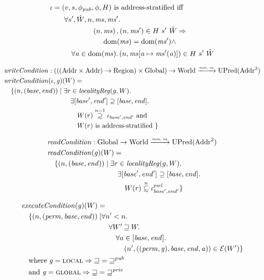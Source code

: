 \documentclass[a4paper]{article}
\newcommand{\update}[2]{[#1 \mapsto #2]}
\newcommand{\monnefun}{\xrightarrow{\textit{\tiny{mon, ne}}}}
\newcommand{\fun}{\rightarrow}
\newcommand\subsetsim{\mathrel{\ooalign{\raise.2ex\hbox{$\subset$}\cr
      \hidewidth\lower.8ex\hbox{\scalebox{0.9}{$\sim$}}\hidewidth\cr}}}
\newcommand\supsetsim{\mathrel{\ooalign{\raise.2ex\hbox{$\supset$}\cr
      \hidewidth\lower.8ex\hbox{\scalebox{0.9}{$\sim$}}\hidewidth\cr}}}
\newcommand{\nsubsim}[1][n]{\stackrel{\tiny{#1}}{\subsetsim}}
\newcommand{\nsupsim}[1][n]{\stackrel{\tiny{#1}}{\supsetsim}}
\DeclareMathOperator{\dom}{dom}
\newcommand{\var}[1]{\mathit{#1}}
\newcommand{\hs}{\var{ms}}
\newcommand{\ms}{\hs}
\newcommand{\gl}{\var{g}}
\newcommand{\addr}{\var{a}}
\newcommand{\start}{\var{base}}
\newcommand{\addrend}{\var{end}}
\newcommand{\perm}{\var{perm}}
\newcommand{\pwl}{\var{pwl}}
\newcommand{\plainfun}[2]{
  \ifthenelse{\equal{#2}{}}
  {\mathit{#1}}
  {\mathit{#1}(#2)}
}
\newcommand{\readCond}[1]{\plainfun{readCondition}{#1}}
\newcommand{\writeCond}[1]{\plainfun{writeCondition}{#1}}
\newcommand{\execCond}[1]{\plainfun{executeCondition}{#1}}
\newcommand{\future}{\mathbin{\sqsupseteq}}
\newcommand{\pub}{\var{pub}}
\newcommand{\futurewk}{\mathbin{\sqsupseteq}^{\var{pub}}}
\newcommand{\futurestr}{\mathbin{\sqsupseteq}^{\var{priv}}}
\newcommand{\asmType}{\plaindom{AsmType}}
\newcommand{\plaindom}[1]{\mathrm{#1}}
\newcommand{\Addrs}{\plaindom{Addr}}
\newcommand{\Globals}{\plaindom{Global}}
\newcommand{\Regions}{\plaindom{Region}}
\newcommand{\Worlds}{\plaindom{World}}
\newcommand{\UPred}[1]{\plaindom{UPred}(#1)}
\newcommand{\intr}[2]{\mathcal{#1}}
\newcommand{\exprintr}[1]{\intr{E}{#1}}
\newcommand{\stder}{\exprintr{\asmType}}
\newcommand{\npair}[2][n]{\left(#1,#2 \right)}
\newcommand{\plainperm}[1]{\textsc{#1}}
\newcommand{\local}{\plainperm{local}}
\newcommand{\glob}{\plainperm{global}}
\begin{document}
\begin{align*}
&\iota = (v,s,\phi_\pub,\phi,H) \text{ is address-stratified iff }\\
&\qquad\begin{multlined}
  \forall s', \hat{W}, n, \ms, \ms' \ldotp \\
  \npair{\ms},\npair{\ms'} \in H~ s'~ \hat{W} \Rightarrow \\
  \dom(\ms) = \dom(\ms') \wedge \\
  \forall \addr \in
  \dom(\ms)\ldotp \npair{\ms\update{\addr}{\ms'(\addr)}} \in H~ s'~ \hat{W}
\end{multlined}
\end{align*}

\begin{align*}
  & \writeCond{} : (((\Addrs\times\Addrs) \fun\Regions) \times \Globals) \fun \Worlds \monnefun \UPred{\Addrs^2}  \\
  & \writeCond{}(\iota,\gl)(W) =  \\
  & \quad \begin{aligned}[t]
    \{ \npair{(\start,\addrend)} \mid & \;\exists r \in \var{localityReg}(g,W) \ldotp \\
    & \;\quad \exists [\start',\addrend'] \supseteq [\start,\addrend] \ldotp \\
    & \;\qquad W(r)\nsupsim[n-1] \iota_{\start',\addrend'} \text{ and }\\
    & \;\qquad W(r) \text{ is address-stratified } \}
  \end{aligned}
\end{align*}

\begin{align*}
  & \readCond{} : \Globals \fun \Worlds \monnefun \UPred{\Addrs^2}  \\
  & \readCond{}(\gl)(W) =  \\
  & \quad \begin{aligned}[t]
    \{ \npair{(\start,\addrend)} \mid & \;\exists r \in \var{localityReg}(g,W) \ldotp \\
    & \;\quad \exists [\start',\addrend'] \supseteq [\start,\addrend] \ldotp \\
    & \;\qquad W(r)\nsubsim[n] \iota_{\start',\addrend'}^\pwl \}
  \end{aligned}
\end{align*}

\begin{align*}
  & \execCond{}(\gl)(W) = \\
  & \quad
    \begin{aligned}[t]
      \{ \npair{(\perm,\start,\addrend)} \mid &  \forall n' < n \ldotp\\
      & \quad \forall W' \future W \ldotp\\
      & \qquad\forall a \in [\start,\addrend] \ldotp\\
      & \qquad \quad \npair[n']{((\perm,\gl),\start,\addrend,\addr)} \in \stder(W')\}
    \end{aligned} \\
  & \quad \text{where } \gl = \local \Rightarrow \future = \futurewk \\
  & \quad \text{and } \gl = \glob \Rightarrow \future = \futurestr
\end{align*}
\end{document}
